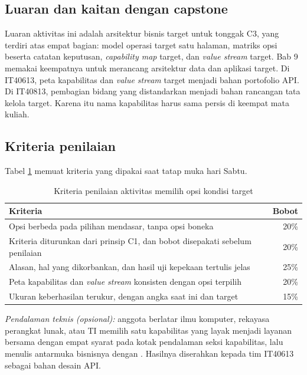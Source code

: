 \subsection*{Luaran dan kaitan dengan capstone}

Luaran aktivitas ini adalah arsitektur bisnis target untuk tonggak C3, yang terdiri atas
empat bagian: model operasi target satu halaman, matriks opsi beserta catatan keputusan,
\textit{capability map} target, dan \textit{value stream} target. Bab 9 memakai keempatnya
untuk merancang arsitektur data dan aplikasi target. Di IT40613, peta kapabilitas dan
\textit{value stream} target menjadi bahan portofolio API. Di IT40813, pembagian bidang yang
distandarkan menjadi bahan rancangan tata kelola target. Karena itu nama kapabilitas harus
sama persis di keempat mata kuliah.

\subsection*{Kriteria penilaian}

Tabel \ref{tab:ch08-kriteria-nilai} memuat kriteria yang dipakai saat tatap muka hari Sabtu.

\begin{table}[!htb]
  \centering
  \caption{Kriteria penilaian aktivitas memilih opsi kondisi target}
  \label{tab:ch08-kriteria-nilai}
  \begin{tabularx}{\textwidth}{>{\raggedright\arraybackslash}Xr}
    \hline
    \textbf{Kriteria} & \textbf{Bobot} \\
    \hline
    Opsi berbeda pada pilihan mendasar, tanpa opsi boneka & 20\% \\
    \hline
    Kriteria diturunkan dari prinsip C1, dan bobot disepakati sebelum penilaian & 20\% \\
    \hline
    Alasan, hal yang dikorbankan, dan hasil uji kepekaan tertulis jelas & 25\% \\
    \hline
    Peta kapabilitas dan \textit{value stream} konsisten dengan opsi terpilih & 20\% \\
    \hline
    Ukuran keberhasilan terukur, dengan angka saat ini dan target & 15\% \\
    \hline
  \end{tabularx}
\end{table}

\textit{Pendalaman teknis (opsional):} anggota berlatar ilmu komputer, rekayasa perangkat
lunak, atau TI memilih satu kapabilitas yang layak menjadi layanan bersama dengan empat
syarat pada kotak pendalaman seksi kapabilitas, lalu menulis antarmuka bisnisnya dengan
. Hasilnya diserahkan kepada
tim IT40613 sebagai bahan desain API.

